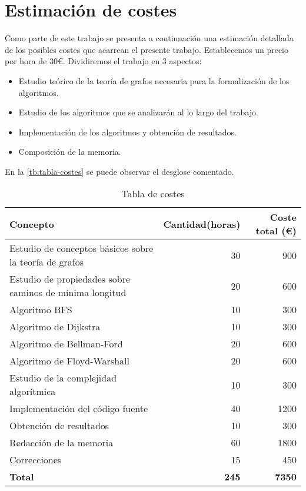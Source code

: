 
\chapter{Estimación de costes}\label{ap:apendice2}

Como parte de este trabajo se presenta a continuación una estimación detallada de los posibles costes que acarrean el presente trabajo. Establecemos un precio por hora de $30$€. Dividiremos el trabajo en $3$ aspectos:

\begin{itemize}
	\item Estudio teórico de la teoría de grafos necesaria para la formalización de los algoritmos.
	\item Estudio de los algoritmos que se analizarán al lo largo del trabajo.
	\item Implementación de los algoritmos y obtención de resultados.
	\item Composición de la memoria.
\end{itemize}

En la \autoref{tb:tabla-costes} se puede observar el desglose comentado.

\begin{table}[htpb]
	\centering
	\begin{tabular}{lrr} \toprule
		\textbf{Concepto} & \textbf{Cantidad(horas)} & \textbf{Coste total (€)}          \\ \toprule
		Estudio de conceptos básicos sobre la teoría de grafos & 30 & 900          \\ 
		Estudio de propiedades sobre caminos de mínima longitud & 20 & 600          \\ \bottomrule
		Algoritmo BFS & 10 & 300          \\ 
		Algoritmo de Dijkstra & 10 & 300          \\
		Algoritmo de Bellman-Ford & 20 & 600          \\ 
		Algoritmo de Floyd-Warshall & 20 & 600          \\
		Estudio de la complejidad algorítmica & 10 & 300          \\  \bottomrule
		Implementación del código fuente & 40 & 1200 \\ 
		Obtención de resultados & 10 & 300 \\ \bottomrule
		Redacción de la memoria & 60 & 1800          \\ 
		Correcciones & 15 & 450          \\ \bottomrule
		\textbf{Total} & \textbf{245} & \textbf{7350}          \\ \bottomrule
	\end{tabular}
	\caption{Tabla de costes}
	\label{tb:tabla-costes}
\end{table}

\endinput
